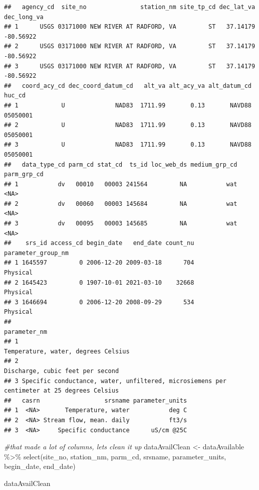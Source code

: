 \documentclass[
]{book}
\newenvironment{Shaded}{\begin{snugshade}}{\end{snugshade}}
\newcommand{\CommentTok}[1]{\textcolor[rgb]{0.56,0.35,0.01}{\textit{#1}}}
\newcommand{\FunctionTok}[1]{\textcolor[rgb]{0.00,0.00,0.00}{#1}}
\newcommand{\NormalTok}[1]{#1}
\newcommand{\OtherTok}[1]{\textcolor[rgb]{0.56,0.35,0.01}{#1}}
\newcommand{\SpecialCharTok}[1]{\textcolor[rgb]{0.00,0.00,0.00}{#1}}
\begin{document}
\begin{verbatim}
##   agency_cd  site_no               station_nm site_tp_cd dec_lat_va dec_long_va
## 1      USGS 03171000 NEW RIVER AT RADFORD, VA         ST   37.14179   -80.56922
## 2      USGS 03171000 NEW RIVER AT RADFORD, VA         ST   37.14179   -80.56922
## 3      USGS 03171000 NEW RIVER AT RADFORD, VA         ST   37.14179   -80.56922
##   coord_acy_cd dec_coord_datum_cd   alt_va alt_acy_va alt_datum_cd   huc_cd
## 1            U              NAD83  1711.99       0.13       NAVD88 05050001
## 2            U              NAD83  1711.99       0.13       NAVD88 05050001
## 3            U              NAD83  1711.99       0.13       NAVD88 05050001
##   data_type_cd parm_cd stat_cd  ts_id loc_web_ds medium_grp_cd parm_grp_cd
## 1           dv   00010   00003 241564         NA           wat        <NA>
## 2           dv   00060   00003 145684         NA           wat        <NA>
## 3           dv   00095   00003 145685         NA           wat        <NA>
##    srs_id access_cd begin_date   end_date count_nu parameter_group_nm
## 1 1645597         0 2006-12-20 2009-03-18      704           Physical
## 2 1645423         0 1907-10-01 2021-03-10    32668           Physical
## 3 1646694         0 2006-12-20 2008-09-29      534           Physical
##                                                                                 parameter_nm
## 1                                                        Temperature, water, degrees Celsius
## 2                                                           Discharge, cubic feet per second
## 3 Specific conductance, water, unfiltered, microsiemens per centimeter at 25 degrees Celsius
##   casrn                  srsname parameter_units
## 1  <NA>       Temperature, water           deg C
## 2  <NA> Stream flow, mean. daily           ft3/s
## 3  <NA>     Specific conductance      uS/cm @25C
\end{verbatim}

\begin{Shaded}
\begin{Highlighting}[]
\CommentTok{\#that made a lot of columns, let\textquotesingle{}s clean it up}
\NormalTok{dataAvailClean }\OtherTok{\textless{}{-}}\NormalTok{ dataAvailable }\SpecialCharTok{\%\textgreater{}\%} \FunctionTok{select}\NormalTok{(site\_no, }
\NormalTok{                                           station\_nm,}
\NormalTok{                                           parm\_cd, }
\NormalTok{                                           srsname, }
\NormalTok{                                           parameter\_units,}
\NormalTok{                                           begin\_date, }
\NormalTok{                                           end\_date)}

\NormalTok{dataAvailClean}
\end{Highlighting}
\end{Shaded}
\end{document}
